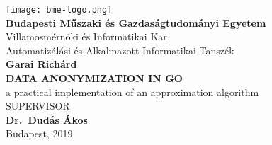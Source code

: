 \begin{titlepage}
	\begin{center}
		\texttt{[image: bme-logo.png]}\\
		\textbf{Budapesti Műszaki és Gazdaságtudományi Egyetem}\\
		Villamosmérnöki és Informatikai Kar\\
		Automatizálási és Alkalmazott Informatikai Tanszék\\
		\vspace{6cm}
		\Large \textbf{Garai Richárd}\\
		\vspace{0.2cm}
		\LARGE \MakeUppercase{\textbf{Data Anonymization in Go}}\\
		\vspace{0.1cm}
		\large a practical implementation of an approximation algorithm\\
		\vspace{5cm}
		\MakeUppercase{Supervisor}\\
		\textbf{Dr.\ Dudás Ákos}\\
        \vspace{1cm}
		Budapest, 2019
	\end{center}
 \end{titlepage}